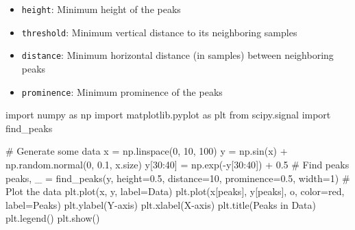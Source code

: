 \documentclass[
  letterpaper,
  DIV=11,
  numbers=noendperiod]{scrreprt}
\newenvironment{Shaded}{\begin{snugshade}}{\end{snugshade}}
\newcommand{\CommentTok}[1]{\textcolor[rgb]{0.37,0.37,0.37}{#1}}
\newcommand{\DecValTok}[1]{\textcolor[rgb]{0.68,0.00,0.00}{#1}}
\newcommand{\FloatTok}[1]{\textcolor[rgb]{0.68,0.00,0.00}{#1}}
\newcommand{\ImportTok}[1]{\textcolor[rgb]{0.00,0.46,0.62}{#1}}
\newcommand{\NormalTok}[1]{\textcolor[rgb]{0.00,0.23,0.31}{#1}}
\newcommand{\OperatorTok}[1]{\textcolor[rgb]{0.37,0.37,0.37}{#1}}
\newcommand{\StringTok}[1]{\textcolor[rgb]{0.13,0.47,0.30}{#1}}
\providecommand{\tightlist}{%
  \setlength{\itemsep}{0pt}\setlength{\parskip}{0pt}}\usepackage{longtable,booktabs,array}
\begin{document}
\begin{itemize}
\tightlist
\item
  \texttt{height}: Minimum height of the peaks
\item
  \texttt{threshold}: Minimum vertical distance to its neighboring
  samples
\item
  \texttt{distance}: Minimum horizontal distance (in samples) between
  neighboring peaks
\item
  \texttt{prominence}: Minimum prominence of the peaks
\end{itemize}

\begin{Shaded}
\begin{Highlighting}[]
\ImportTok{import}\NormalTok{ numpy }\ImportTok{as}\NormalTok{ np}
\ImportTok{import}\NormalTok{ matplotlib.pyplot }\ImportTok{as}\NormalTok{ plt}
\ImportTok{from}\NormalTok{ scipy.signal }\ImportTok{import}\NormalTok{ find\_peaks}

\CommentTok{\# Generate some data}
\NormalTok{x }\OperatorTok{=}\NormalTok{ np.linspace(}\DecValTok{0}\NormalTok{, }\DecValTok{10}\NormalTok{, }\DecValTok{100}\NormalTok{)}
\NormalTok{y }\OperatorTok{=}\NormalTok{ np.sin(x) }\OperatorTok{+}\NormalTok{ np.random.normal(}\DecValTok{0}\NormalTok{, }\FloatTok{0.1}\NormalTok{, x.size)}
\NormalTok{y[}\DecValTok{30}\NormalTok{:}\DecValTok{40}\NormalTok{] }\OperatorTok{=}\NormalTok{ np.exp(}\OperatorTok{{-}}\NormalTok{y[}\DecValTok{30}\NormalTok{:}\DecValTok{40}\NormalTok{]) }\OperatorTok{+} \FloatTok{0.5}
\CommentTok{\# Find peaks}
\NormalTok{peaks, \_ }\OperatorTok{=}\NormalTok{ find\_peaks(y, height}\OperatorTok{=}\FloatTok{0.5}\NormalTok{, distance}\OperatorTok{=}\DecValTok{10}\NormalTok{, prominence}\OperatorTok{=}\FloatTok{0.5}\NormalTok{, width}\OperatorTok{=}\DecValTok{1}\NormalTok{)}
\CommentTok{\# Plot the data}
\NormalTok{plt.plot(x, y, label}\OperatorTok{=}\StringTok{\textquotesingle{}Data\textquotesingle{}}\NormalTok{)    }
\NormalTok{plt.plot(x[peaks], y[peaks], }\StringTok{\textquotesingle{}o\textquotesingle{}}\NormalTok{, color}\OperatorTok{=}\StringTok{\textquotesingle{}red\textquotesingle{}}\NormalTok{, label}\OperatorTok{=}\StringTok{\textquotesingle{}Peaks\textquotesingle{}}\NormalTok{)}
\NormalTok{plt.ylabel(}\StringTok{\textquotesingle{}Y{-}axis\textquotesingle{}}\NormalTok{)}
\NormalTok{plt.xlabel(}\StringTok{\textquotesingle{}X{-}axis\textquotesingle{}}\NormalTok{)}
\NormalTok{plt.title(}\StringTok{\textquotesingle{}Peaks in Data\textquotesingle{}}\NormalTok{)}
\NormalTok{plt.legend()}
\NormalTok{plt.show()}
\end{Highlighting}
\end{Shaded}
\end{document}
